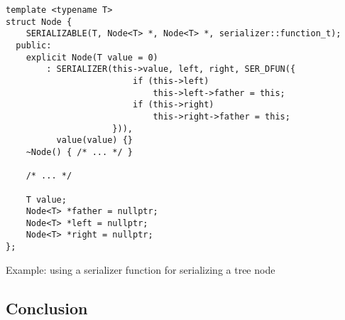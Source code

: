 \begin{listing}[ht!]
\begin{verbatim}
template <typename T>
struct Node {
    SERIALIZABLE(T, Node<T> *, Node<T> *, serializer::function_t);
  public:
    explicit Node(T value = 0)
        : SERIALIZER(this->value, left, right, SER_DFUN({
                         if (this->left)
                             this->left->father = this;
                         if (this->right)
                             this->right->father = this;
                     })),
          value(value) {}
    ~Node() { /* ... */ }

    /* ... */

    T value;
    Node<T> *father = nullptr;
    Node<T> *left = nullptr;
    Node<T> *right = nullptr;
};
\end{verbatim}
\caption{Example: using a serializer function for serializing a tree node}
\label{lst:treenode}
\end{listing}

\subsection{Conclusion}
